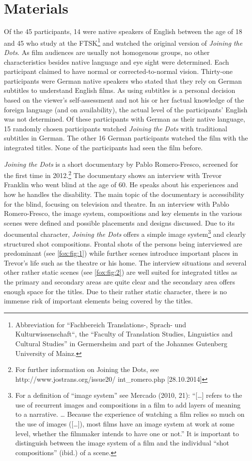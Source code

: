 \documentclass[output=paper]{langsci/langscibook}
\begin{document}
\section{Materials}

Of the 45 participants, 14 were native speakers of English between the age of 18 and 45 who study at the FTSK\footnote{Abbreviation for “Fachbereich Translations-, Sprach- und Kulturwissenschaft“, the “Faculty of Translation Studies, Linguistics and Cultural Studies” in Germersheim and part of the Johannes Gutenberg University of Mainz.} and watched the original version of \textit{Joining the Dots}. As film audiences are usually not homogenous groups, no other characteristics besides native language and eye sight were determined. Each participant claimed to have normal or corrected-to-normal vision. Thirty-one participants were German native speakers who stated that they rely on German subtitles to understand English films. As using subtitles is a personal decision based on the viewer’s self-assessment and not his or her factual knowledge of the foreign language (and on availability), the actual level of the participants’ English was not determined. Of these participants with German as their native language, 15 randomly chosen participants watched \textit{Joining the Dots} with traditional subtitles in German. The other 16 German participants watched the film with the integrated titles. None of the participants had seen the film before.


\textit{Joining the Dots} is a short documentary by Pablo Romero-Fresco, screened for the first time in 2012.\footnote{For further information on Joining the Dots, see http://www.jostrans.org/issue20/
int\_romero.php [28.10.2014]} The documentary shows an interview with Trevor Franklin who went blind at the age of 60. He speaks about his experiences and how he handles the disability. The main topic of the documentary is accessibility for the blind, focusing on television and theatre. In an interview with Pablo Romero-Fresco, the image system, compositions and key elements in the various scenes were defined and possible placements and designs discussed. Due to its documental character, \textit{Joining the Dots} offers a simple image system\footnote{For a definition of “image system” see Mercado (2010, 21): “[…] refers to the use of recurrent images and compositions in a film to add layers of meaning to a narrative. … Because the experience of watching a film relies so much on the use of images ([…]), most films have an image system at work at some level, whether the filmmaker intends to have one or not.” It is important to distinguish between the image system of a film and the individual “shot compositions” (ibid.) of a scene.} and clearly structured shot compositions. Frontal shots of the persons being interviewed are predominant (see \ref{fox:fig:1}) while further scenes introduce important places in Trevor’s life such as the theatre or his home. The interview situations and several other rather static scenes (see \ref{fox:fig:2}) are well suited for integrated titles as the primary and secondary areas are quite clear and the secondary area offers enough space for the titles. Due to their rather static character, there is no immense risk of important elements being covered by the titles.
\end{document}

